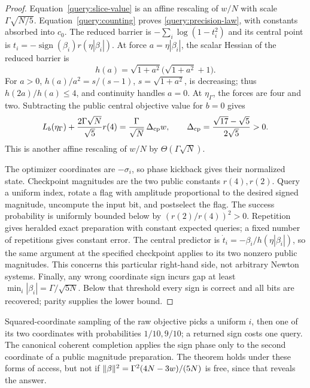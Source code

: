 \begin{proof}
Equation~\eqref{query:slice-value} is an affine rescaling of $w/N$ with
scale $\Gamma\sqrt{N/5}$. Equation~\eqref{query:counting} proves
\eqref{query:precision-law}, with constants absorbed into $c_0$.
The reduced barrier is $-\sum_i\log(1-t_i^2)$ and its central point is
$t_i=-\operatorname{sign}(\beta_i)r(\eta|\beta_i|)$.
At force $a=\eta|\beta_i|$, the scalar Hessian of the reduced barrier is
\[
 h(a)=\sqrt{1+a^2}\bigl(\sqrt{1+a^2}+1\bigr).
\]
For $a>0$, $h(a)/a^2=s/(s-1)$, $s=\sqrt{1+a^2}$, is decreasing;
thus $h(2a)/h(a)\leq4$, and continuity handles $a=0$.
At $\eta_\Gamma$, the forces are four and two. Subtracting the public central
objective value for $b=0$ gives
\begin{equation}\label{query:checkpoint}
 L_b(\eta_\Gamma)+\frac{2\Gamma\sqrt N}{\sqrt5}r(4)
   =\frac{\Gamma}{\sqrt N}\,\Delta_{\rm cp}w,
 \qquad
 \Delta_{\rm cp}=\frac{\sqrt{17}-\sqrt5}{2\sqrt5}>0.
\end{equation}
This is another affine rescaling of $w/N$ by $\Theta(\Gamma\sqrt N)$.

The optimizer coordinates are $-\sigma_i$, so phase kickback gives their
normalized state. Checkpoint magnitudes are the two public constants
$r(4),r(2)$. Query a uniform index, rotate a flag with amplitude proportional
to the desired signed magnitude, uncompute the input bit, and postselect
the flag. The success probability is uniformly bounded below by
$(r(2)/r(4))^2>0$. Repetition gives heralded exact preparation with
constant expected queries; a fixed number of repetitions gives constant
error. The central predictor is
$\dot t_i=-\beta_i/h(\eta|\beta_i|)$, so the same argument at the specified
checkpoint applies to its two nonzero public magnitudes. This concerns
this particular right-hand side, not arbitrary Newton systems. Finally, any
wrong coordinate sign incurs gap at least
$\min_i|\beta_i|=\Gamma/\sqrt{5N}$. Below that threshold every sign is
correct and all bits are recovered; parity supplies the lower bound.
\end{proof}

Squared-coordinate sampling of the raw objective picks a uniform $i$,
then one of its two coordinates with probabilities $1/10,9/10$; a
returned sign costs one query. The canonical coherent completion
applies the sign phase only to the second coordinate of a public
magnitude preparation. The theorem holds under these forms of access,
but not if $\lVert \beta\rVert^2=\Gamma^2(4N-3w)/(5N)$ is free,
since that reveals the answer.

